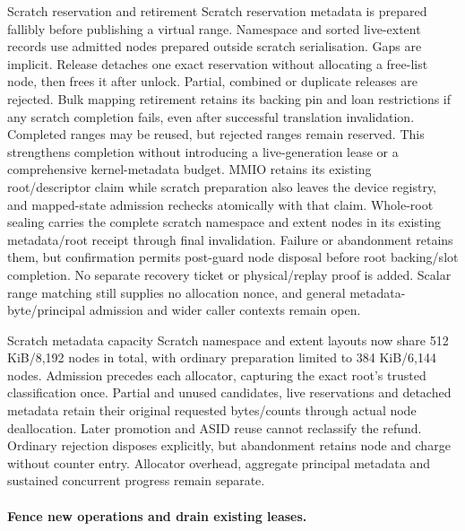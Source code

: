 \begin{implementationdetail}{Scratch reservation and retirement}
Scratch reservation metadata is prepared fallibly before publishing a virtual
range. Namespace and sorted live-extent records use admitted nodes prepared
outside scratch serialisation. Gaps are implicit. Release detaches one exact
reservation without allocating a free-list node, then frees it after unlock.
Partial, combined or duplicate releases are rejected. Bulk mapping retirement
retains its backing pin and loan restrictions if any scratch completion fails,
even after successful translation invalidation. Completed ranges may be reused, but
rejected ranges remain reserved. This strengthens completion without introducing
a live-generation lease or a comprehensive kernel-metadata budget.
MMIO retains its existing root/descriptor claim while scratch preparation also
leaves the device registry, and mapped-state admission rechecks atomically with that
claim. Whole-root sealing carries the complete scratch namespace and extent nodes
in its existing metadata/root receipt through final invalidation. Failure or
abandonment retains them, but confirmation permits post-guard node disposal before
root backing/slot completion. No separate recovery ticket or physical/replay proof
is added. Scalar range matching still supplies no allocation nonce, and general
metadata-byte/principal admission and wider caller contexts remain open.
\end{implementationdetail}

\begin{implementationdetail}{Scratch metadata capacity}
Scratch namespace and extent layouts now share 512 KiB/8,192 nodes in total,
with ordinary preparation limited to 384 KiB/6,144 nodes. Admission precedes each
allocator, capturing the exact root's trusted classification once. Partial and
unused candidates, live reservations and detached metadata retain their original
requested bytes/counts through actual node deallocation. Later promotion and
ASID reuse cannot reclassify the refund. Ordinary rejection disposes explicitly, but
abandonment retains node and charge without counter entry. Allocator overhead,
aggregate principal metadata and sustained concurrent progress remain separate.
\end{implementationdetail}

\paragraph*{Fence new operations and drain existing leases.}

